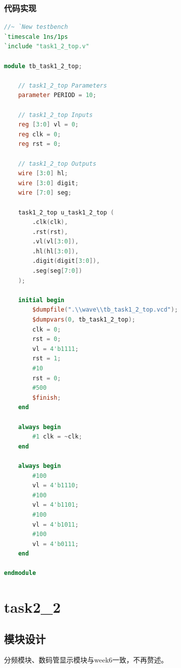 \documentclass[UTF8]{ctexart}
\begin{document}
\subsubsection{代码实现}
\begin{framed}
	\begin{lstlisting}[language=verilog,style=verilogStyle]
//~ `New testbench
`timescale 1ns/1ps
`include "task1_2_top.v"

module tb_task1_2_top;

    // task1_2_top Parameters
    parameter PERIOD = 10;

    // task1_2_top Inputs
    reg [3:0] vl = 0;
    reg clk = 0;
    reg rst = 0;

    // task1_2_top Outputs
    wire [3:0] hl;
    wire [3:0] digit;
    wire [7:0] seg;

    task1_2_top u_task1_2_top (
        .clk(clk),
        .rst(rst),
        .vl(vl[3:0]),
        .hl(hl[3:0]),
        .digit(digit[3:0]),
        .seg(seg[7:0])
    );

    initial begin
        $dumpfile(".\\wave\\tb_task1_2_top.vcd");
        $dumpvars(0, tb_task1_2_top);
        clk = 0;
        rst = 0;
        vl = 4'b1111;
        rst = 1;
        #10
        rst = 0;
        #500
        $finish;
    end

    always begin
        #1 clk = ~clk;
    end

    always begin
        #100
        vl = 4'b1110;
        #100
        vl = 4'b1101;
        #100
        vl = 4'b1011;
        #100
        vl = 4'b0111;
    end

endmodule
    \end{lstlisting}
\end{framed}
\section{task2\_2}
\subsection{模块设计}
分频模块、数码管显示模块与week6一致，不再赘述。
\end{document}
